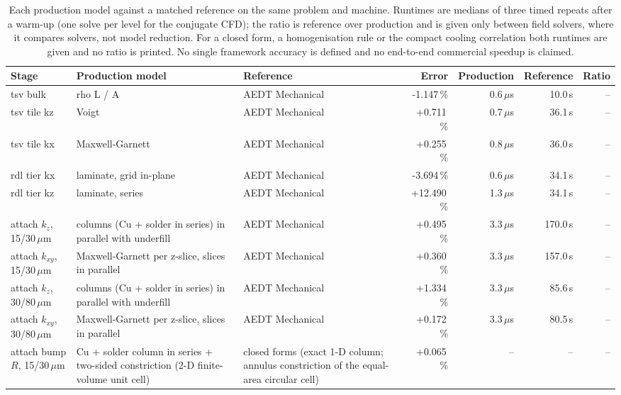 \begin{table}[!t]
\caption{Each production model against a matched reference on the same problem and machine. Runtimes are medians of three timed repeats after a warm-up (one solve per level for the conjugate CFD); the ratio is reference over production and is given only between field solvers, where it compares solvers, not model reduction. For a closed form, a homogenisation rule or the compact cooling correlation both runtimes are given and no ratio is printed. No single framework accuracy is defined and no end-to-end commercial speedup is claimed.}
\label{tab:accspeed}
\centering
\scriptsize
\begin{tabular}{@{}L{3.3cm}L{3.0cm}L{3.6cm}rrrr@{}}
\toprule
Stage & Production model & Reference & Error & Production & Reference & Ratio \\
\midrule
tsv bulk & rho L / A & AEDT Mechanical & -1.147\,\% & 0.6\,$\mu$s & 10.0\,s & -- \\
tsv tile kz & Voigt & AEDT Mechanical & +0.711\,\% & 0.7\,$\mu$s & 36.1\,s & -- \\
tsv tile kx & Maxwell-Garnett & AEDT Mechanical & +0.255\,\% & 0.8\,$\mu$s & 36.0\,s & -- \\
rdl tier kx & laminate, grid in-plane & AEDT Mechanical & -3.694\,\% & 0.6\,$\mu$s & 34.1\,s & -- \\
rdl tier kz & laminate, series & AEDT Mechanical & +12.490\,\% & 1.3\,$\mu$s & 34.1\,s & -- \\
attach $k_z$, 15/30\,$\mu$m & columns (Cu + solder in series) in parallel with underfill & AEDT Mechanical & +0.495\,\% & 3.3\,$\mu$s & 170.0\,s & -- \\
attach $k_{xy}$, 15/30\,$\mu$m & Maxwell-Garnett per z-slice, slices in parallel & AEDT Mechanical & +0.360\,\% & 3.3\,$\mu$s & 157.0\,s & -- \\
attach $k_z$, 30/80\,$\mu$m & columns (Cu + solder in series) in parallel with underfill & AEDT Mechanical & +1.334\,\% & 3.3\,$\mu$s & 85.6\,s & -- \\
attach $k_{xy}$, 30/80\,$\mu$m & Maxwell-Garnett per z-slice, slices in parallel & AEDT Mechanical & +0.172\,\% & 3.3\,$\mu$s & 80.5\,s & -- \\
attach bump $R$, 15/30\,$\mu$m & Cu + solder column in series + two-sided constriction (2-D finite-volume unit cell) & closed forms (exact 1-D column; annulus constriction of the equal-area circular cell) & +0.065\,\% & -- & -- & -- \\

\end{tabular}
\end{table}

